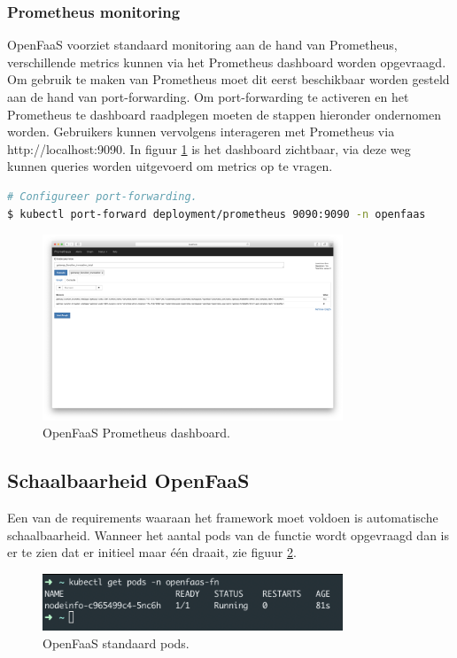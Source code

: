 \subsubsection{Prometheus monitoring}
OpenFaaS voorziet standaard monitoring aan de hand van Prometheus, verschillende metrics kunnen via het Prometheus dashboard worden opgevraagd. Om gebruik te maken van Prometheus moet dit eerst beschikbaar worden gesteld aan de hand van port-forwarding. Om port-forwarding te activeren en het Prometheus te dashboard raadplegen moeten de stappen hieronder ondernomen worden. Gebruikers kunnen  vervolgens interageren met Prometheus via http://localhost:9090. In figuur \ref{fig:openfaas-prometheus} is het dashboard zichtbaar, via deze weg kunnen queries worden uitgevoerd om metrics op te vragen.
\begin{lstlisting}[language=bash]
# Configureer port-forwarding.
$ kubectl port-forward deployment/prometheus 9090:9090 -n openfaas
\end{lstlisting}

\begin{figure}
    \centering
    \includegraphics[width=0.8\textwidth]{img/openfaas-prometheus}
    \caption{OpenFaaS Prometheus dashboard.}
    \label{fig:openfaas-prometheus}  
\end{figure}

\subsection{Schaalbaarheid OpenFaaS}
Een van de requirements waaraan het framework moet voldoen is automatische schaalbaarheid. Wanneer het aantal pods van de functie wordt opgevraagd dan is er te zien dat er initieel maar één draait, zie figuur \ref{fig:openfaas-scalability-1}.
\begin{figure}
    \centering
    \includegraphics[width=0.8\textwidth]{img/openfaas-scalability-1.png}
    \caption{OpenFaaS standaard pods.}
    \label{fig:openfaas-scalability-1}  
\end{figure}

